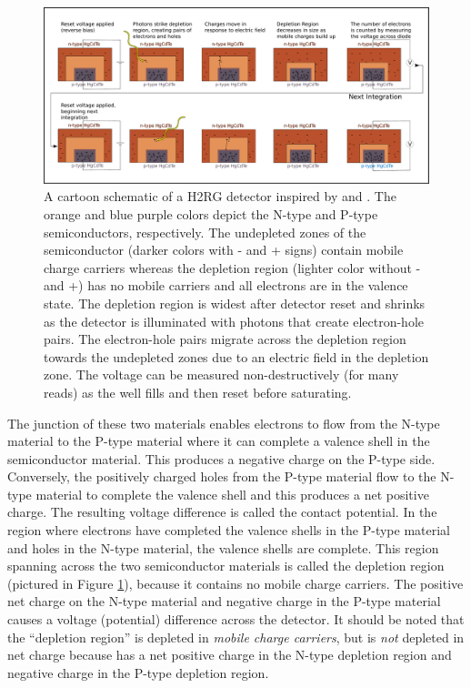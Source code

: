 \documentclass{aastex62}
\begin{document}
\begin{figure}[!hbtp]
\centering
\includegraphics[width=.99\columnwidth]{ideal_photodiode.pdf}
\caption{A cartoon schematic of a H2RG detector inspired by \citet{smith2008imgPersistence} and \citet{tulloch2018persistenceH2RG}.
The orange and blue purple colors depict the N-type and P-type semiconductors, respectively.
The undepleted zones of the semiconductor (darker colors with - and + signs) contain mobile charge carriers whereas the depletion region (lighter color without - and +) has no mobile carriers and all electrons are in the valence state.
The depletion region is widest after detector reset and shrinks as the detector is illuminated with photons that create electron-hole pairs.
The electron-hole pairs migrate across the depletion region towards the undepleted zones due to an electric field in the depletion zone.
The voltage can be measured non-destructively (for many reads) as the well fills and then reset before saturating.}\label{fig:npSchematic}
\end{figure}



The junction of these two materials enables electrons to flow from the N-type material to the P-type material where it can complete a valence shell in the semiconductor material.
This produces a negative charge on the P-type side.
Conversely, the positively charged holes from the P-type material flow to the N-type material to complete the valence shell and this produces a net positive charge.
The resulting voltage difference is called the contact potential.
In the region where electrons have completed the valence shells in the P-type material and holes in the N-type material, the valence shells are complete.
This region spanning across the two semiconductor materials is called the depletion region (pictured in Figure \ref{fig:npSchematic}), because it contains no mobile charge carriers.
The positive net charge on the N-type material and negative charge in the P-type material causes a voltage (potential) difference across the detector.
It should be noted that the ``depletion region'' is depleted in {\it mobile charge carriers}, but is {\it not} depleted in net charge because has a net positive charge in the N-type depletion region and negative charge in the P-type depletion region.
\end{document}

